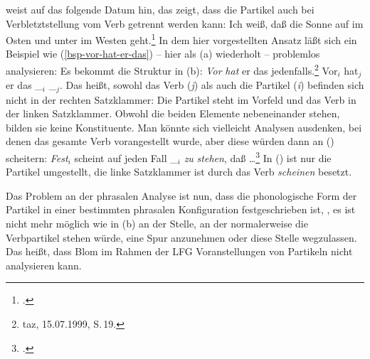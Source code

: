 \citet*[]{Luedeling2001a} weist auf das folgende Datum hin, das zeigt, dass die Partikel
auch bei Verbletztstellung vom Verb getrennt werden kann:
\ea
\label{ex-auf-im-osten-geht}
Ich weiß, daß die Sonne auf              im     Osten und unter               im     Westen geht.\footnote{
        .%
}
\z
In dem hier vorgestellten Ansatz läßt sich ein Beispiel wie (\ref{bsp-vor-hat-er-das})
-- hier als (a) wiederholt -- problemlos analysieren: Es bekommt die Struktur in (b):
\eal
\ex \label{bsp-vor-hat-er-das-zwei}
\emph{Vor} \emph{hat} er das jedenfalls.\footnote{
taz, 15.07.1999, S.\,19.
}
\ex Vor$_i$ hat$_j$ er das \_$_i$ \_$_j$.
\zl
Das heißt, sowohl das Verb (\emph{j}) als auch die Partikel (\emph{i}) befinden
sich nicht in der rechten Satzklammer: Die Partikel steht im Vorfeld und das Verb
in der linken Satzklammer. Obwohl die beiden Elemente nebeneinander stehen, bilden
sie keine Konstituente. Man könnte sich vielleicht Analysen ausdenken, bei denen
das gesamte Verb vorangestellt wurde, aber diese würden dann an () scheitern:
\ea 
\emph{Fest}$_i$ scheint auf jeden Fall \_$_i$ \emph{zu} \emph{stehen}, daß \ldots\footnote{
        .
       }
\z
In () ist nur die Partikel umgestellt, die linke Satzklammer ist durch das Verb \emph{scheinen}
besetzt.

Das Problem an der phrasalen Analyse ist nun, dass die phonologische Form der Partikel in einer bestimmten
phrasalen Konfiguration festgeschrieben ist, \dash, es ist nicht mehr möglich wie in (b)
an der Stelle, an der normalerweise die Verbpartikel stehen würde, eine Spur anzunehmen
oder diese Stelle wegzulassen. Das heißt, dass Blom im Rahmen der LFG Voranstellungen
von Partikeln nicht analysieren kann.

